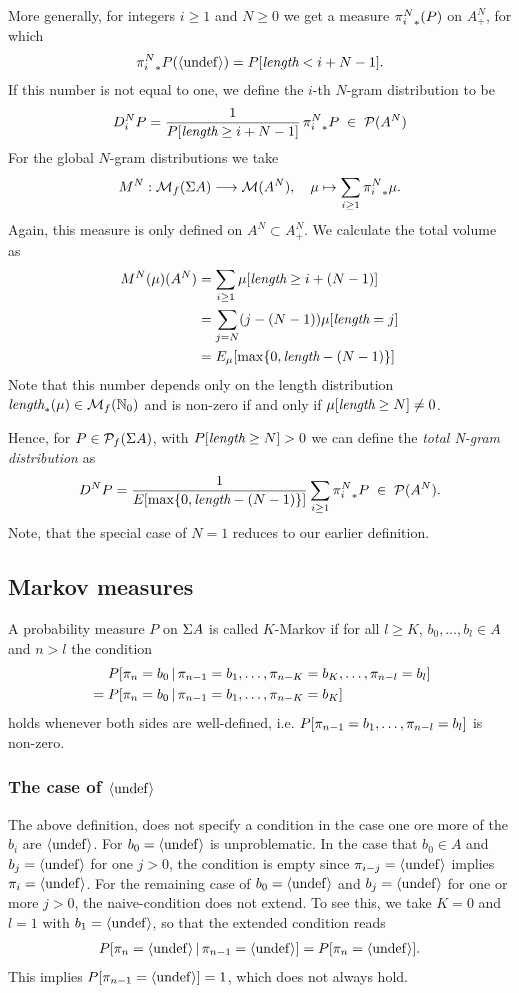\documentclass[11pt]{article}
\begin{document}
More generally, for integers $i \geq 1$ and $N \geq 0$ we get a
measure ${\pi_{i}^{N}}_*(P)$ on $A^N_+$, for which
\[ {\pi_{i}^{N}}_* P (\langle \mathrm{undef} \rangle) =  P[\text{\it length} < i + N -1]. \]
If this number is not equal to one, we define the $i$-th $N$-gram
distribution to be
\[ D_i^N P = \frac{1}{P[\text{\it length} \geq i+N-1]} \, 
             {\pi_{i}^{N}}_* P \;\in\; \mathcal{P}(A^N) \]
For the global $N$-gram distributions we take
\[ M^N: \mathcal{M}_f(\Sigma A) \longrightarrow \mathcal{M}(A^N), \quad \mu \mapsto \sum_{i
\geq 1} {\pi_{i}^{N}}_* \mu. \]
Again, this measure is only defined on $A^N \subset A^N_+$.
We calculate the total volume as
\begin{align} 
  M^N(\mu)(A^N) &= \sum_{i \geq 1} \mu[\text{\it length} \geq i + (N-1)] \\
                &= \sum_{j = N} (j-(N-1)) \mu[\text{\it length} = j]    \\
                &= E_{\mu}[\max\{ 0, \text{\it length} - (N-1) \} ]  
\end{align}
Note that this number depends only on the length distribution
$\text{\it length}_*(\mu) \in \mathcal{M}_f({\mathbb N}_0)$ and is non-zero if and only if
$\mu[\text{\it length} \geq N] \neq 0$. 

Hence, for $P \in \mathcal{P}_f(\Sigma A)$, with $P[\text{\it length} \geq N] > 0$ we can define the
{\it total N-gram distribution} as
\[ D^N P = \frac{1}{E_{}[\max\{ 0, \text{\it length} - (N-1) \} ]}
           \sum_{i \geq 1} {\pi_{i}^{N}}_* P \;\in\; \mathcal{P}(A^N). \]
Note, that the special case of $N=1$ reduces to our earlier definition.

\subsection{Markov measures}

A probability measure $P$ on $\Sigma A$ is called $K$-Markov if
for all $l \geq K$, $b_0,\dots,b_l \in A$ and $n > l$ the condition
\begin{align*}
  &  P[ {\pi_{n}} = b_0 \,|\, {\pi_{n-1}} = b_1, \dots, {\pi_{n-K}} = b_K, \dots, {\pi_{n-l}} = b_l ] \\  
 \;=\;&  P[ {\pi_{n}} = b_0 \,|\, {\pi_{n-1}} = b_1, \dots, {\pi_{n-K}} = b_K ]
\end{align*}
holds whenever both sides are well-defined, i.e.
$P[{\pi_{n-1}} = b_1,\dots, {\pi_{n-l}} = b_l ]$ is non-zero.

\subsubsection{The case of $\langle \mathrm{undef} \rangle$}
The above definition, does not specify a
condition in the case one ore more of the $b_i$ are $\langle \mathrm{undef} \rangle$.
For $b_0=\langle \mathrm{undef} \rangle$ is unproblematic. In the case that $b_0 \in A$ and $b_j =
\langle \mathrm{undef} \rangle$ for one $j > 0$, the condition is empty since ${\pi_{i-j}} =
\langle \mathrm{undef} \rangle$ implies ${\pi_{i}}=\langle \mathrm{undef} \rangle$. For the remaining case 
of $b_0 = \langle \mathrm{undef} \rangle$ and $b_j = \langle \mathrm{undef} \rangle$ for one or more $j > 0$,
the naive-condition does not extend. To see this, we take $K=0$ and
$l=1$ with $b_1 = \langle \mathrm{undef} \rangle$, so that the extended condition reads
\begin{align}
P[{\pi_{n}} = \langle \mathrm{undef} \rangle \,|\, {\pi_{n-1}} = \langle \mathrm{undef} \rangle ] = P[{\pi_{n}} = \langle \mathrm{undef} \rangle ].
\end{align}
This implies $P[{\pi_{n-1}} = \langle \mathrm{undef} \rangle] = 1$, which does not always hold.
\end{document}
